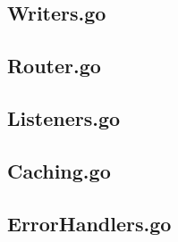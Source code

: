 \begin{appendices}
\subsection{Writers.go}
\label{sec:writer.go}


\newpage
\subsection{Router.go}
\label{sec:Router.go}


\subsection{Listeners.go}
\label{sec:Listeners.go}


\subsection{Caching.go}
\label{sec:Caching.go}


\subsection{ErrorHandlers.go}
\label{sec:ErrorHandlers.go}


\end{appendices}



